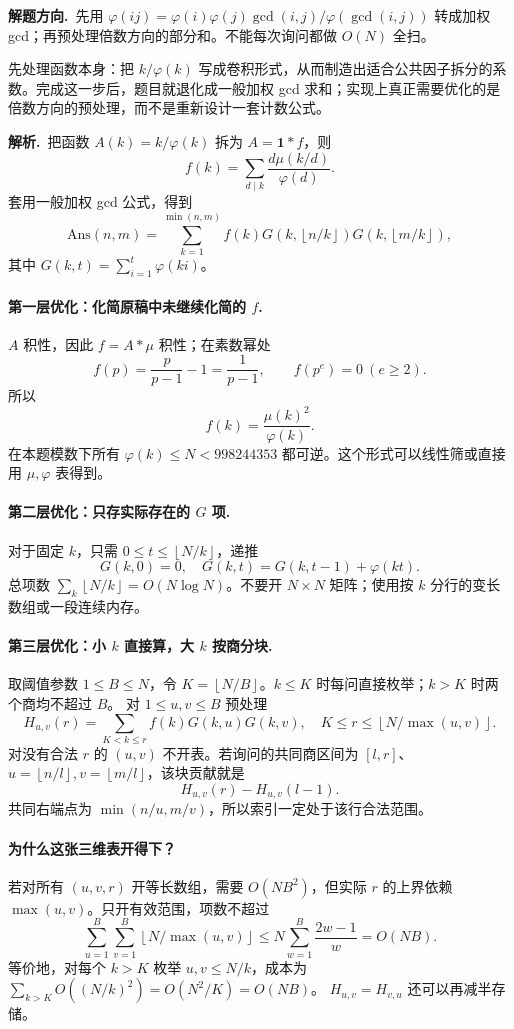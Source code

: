 \documentclass[UTF8,a4paper,11pt,twoside,openright,fontset=fandol]{ctexbook}
\theoremstyle{definition}
\newcommand{\one}{\mathbf 1}
\newcommand{\floor}[1]{\left\lfloor #1\right\rfloor}
\newcommand{\sol}{\par\noindent\textbf{解析.}\ }
\newcommand{\hint}{\par\noindent\textbf{解题方向.}\ }
\begin{document}
\hint 先用 $\varphi(ij)=\varphi(i)\varphi(j)\gcd(i,j)/\varphi(\gcd(i,j))$ 转成加权 gcd；再预处理倍数方向的部分和。不能每次询问都做 $O(N)$ 全扫。

\begin{pitfall}[讲解：先看这题到底在做什么]
先处理函数本身：把 $k/\varphi(k)$ 写成卷积形式，从而制造出适合公共因子拆分的系数。完成这一步后，题目就退化成一般加权 gcd 求和；实现上真正需要优化的是倍数方向的预处理，而不是重新设计一套计数公式。
\end{pitfall}

\sol 把函数 $A(k)=k/\varphi(k)$ 拆为 $A=\one*f$，则
\[
 f(k)=\sum_{d\mid k}\frac{d\mu(k/d)}{\varphi(d)}.
\]
套用一般加权 gcd 公式，得到
\[
\boxed{\mathrm{Ans}(n,m)=\sum_{k=1}^{\min(n,m)}f(k)
G\left(k,\floor{n/k}\right)G\left(k,\floor{m/k}\right)},
\]
其中 $G(k,t)=\sum_{i=1}^t\varphi(ki)$。

\paragraph{第一层优化：化简原稿中未继续化简的 $f$.}
$A$ 积性，因此 $f=A*\mu$ 积性；在素数幂处
\[
 f(p)=\frac p{p-1}-1=\frac1{p-1},\qquad
 f(p^e)=0\ (e\ge2).
\]
所以
\[
 f(k)=\frac{\mu(k)^2}{\varphi(k)}.
\]
在本题模数下所有 $\varphi(k)\le N<998244353$ 都可逆。这个形式可以线性筛或直接用 $\mu,\varphi$ 表得到。

\paragraph{第二层优化：只存实际存在的 $G$ 项.}
对于固定 $k$，只需 $0\le t\le\floor{N/k}$，递推
\[
 G(k,0)=0,\quad G(k,t)=G(k,t-1)+\varphi(kt).
\]
总项数 $\sum_k\floor{N/k}=O(N\log N)$。不要开 $N\times N$ 矩阵；使用按 $k$ 分行的变长数组或一段连续内存。

\paragraph{第三层优化：小 $k$ 直接算，大 $k$ 按商分块.}
取阈值参数 $1\le B\le N$，令 $K=\floor{N/B}$。$k\le K$ 时每问直接枚举；$k>K$ 时两个商均不超过 $B$。
对 $1\le u,v\le B$ 预处理
\[
 H_{u,v}(r)=\sum_{K<k\le r}f(k)G(k,u)G(k,v),
 \quad K\le r\le\floor{N/\max(u,v)}.
\]
对没有合法 $r$ 的 $(u,v)$ 不开表。若询问的共同商区间为 $[l,r]$、$u=\floor{n/l},v=\floor{m/l}$，该块贡献就是
\[
 H_{u,v}(r)-H_{u,v}(l-1).
\]
共同右端点为 $\min(n/u,m/v)$，所以索引一定处于该行合法范围。

\paragraph{为什么这张三维表开得下？}
若对所有 $(u,v,r)$ 开等长数组，需要 $O(NB^2)$，但实际 $r$ 的上界依赖 $\max(u,v)$。只开有效范围，项数不超过
\[
\sum_{u=1}^B\sum_{v=1}^B\floor{N/\max(u,v)}
\le N\sum_{w=1}^B\frac{2w-1}{w}=O(NB).
\]
等价地，对每个 $k>K$ 枚举 $u,v\le N/k$，成本为
$\sum_{k>K}O((N/k)^2)=O(N^2/K)=O(NB)$。
$H_{u,v}=H_{v,u}$ 还可以再减半存储。
\end{document}
